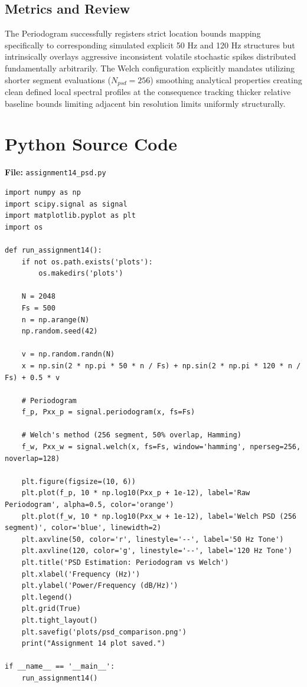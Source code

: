 \documentclass[11pt, a4paper]{article}
\begin{document}
\subsection{Metrics and Review}
The Periodogram successfully registers strict location bounds mapping specifically to corresponding simulated explicit 50 Hz and 120 Hz structures but intrinsically overlays aggressive inconsistent volatile stochastic spikes distributed fundamentally arbitrarily. The Welch configuration explicitly mandates utilizing shorter segment evaluations ($N_{psd}=256$) smoothing analytical properties creating clean defined local spectral profiles at the consequence tracking thicker relative baseline bounds limiting adjacent bin resolution limits uniformly structurally.

\appendix
\section{Python Source Code}
\textbf{File:} \texttt{assignment14\_psd.py}
\begin{lstlisting}[caption={Spectral Estimation: Periodogram vs. Welch PSD -- Assignment 14}]
import numpy as np
import scipy.signal as signal
import matplotlib.pyplot as plt
import os

def run_assignment14():
    if not os.path.exists('plots'):
        os.makedirs('plots')

    N = 2048
    Fs = 500
    n = np.arange(N)
    np.random.seed(42)

    v = np.random.randn(N)
    x = np.sin(2 * np.pi * 50 * n / Fs) + np.sin(2 * np.pi * 120 * n / Fs) + 0.5 * v

    # Periodogram
    f_p, Pxx_p = signal.periodogram(x, fs=Fs)

    # Welch's method (256 segment, 50% overlap, Hamming)
    f_w, Pxx_w = signal.welch(x, fs=Fs, window='hamming', nperseg=256, noverlap=128)

    plt.figure(figsize=(10, 6))
    plt.plot(f_p, 10 * np.log10(Pxx_p + 1e-12), label='Raw Periodogram', alpha=0.5, color='orange')
    plt.plot(f_w, 10 * np.log10(Pxx_w + 1e-12), label='Welch PSD (256 segment)', color='blue', linewidth=2)
    plt.axvline(50, color='r', linestyle='--', label='50 Hz Tone')
    plt.axvline(120, color='g', linestyle='--', label='120 Hz Tone')
    plt.title('PSD Estimation: Periodogram vs Welch')
    plt.xlabel('Frequency (Hz)')
    plt.ylabel('Power/Frequency (dB/Hz)')
    plt.legend()
    plt.grid(True)
    plt.tight_layout()
    plt.savefig('plots/psd_comparison.png')
    print("Assignment 14 plot saved.")

if __name__ == '__main__':
    run_assignment14()
\end{lstlisting}
\end{document}

